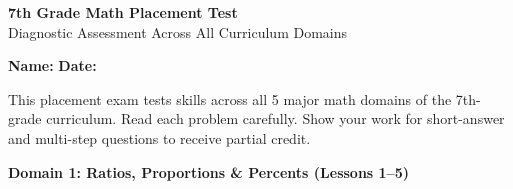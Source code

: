 \documentclass[12pt, letterpaper, fleqn]{article}
\begin{document}
\begin{center}
    {\LARGE \textbf{7th Grade Math Placement Test}}\\[4pt]
    {\large Diagnostic Assessment Across All Curriculum Domains}
\end{center}

\vspace{4mm}
\textbf{Name:} \underline{\hspace{6cm}}
\hfill
\textbf{Date:} \underline{\hspace{4cm}}\\
\vspace{2mm}

\begin{tcolorbox}[colback=black!5, colframe=black!40, arc=2mm, title=\textbf{Instructions for Students}]
This placement exam tests skills across all 5 major math domains of the 7th-grade curriculum. Read each problem carefully. Show your work for short-answer and multi-step questions to receive partial credit.
\end{tcolorbox}

\vspace{4mm}

\begin{tcolorbox}[colback=white, colframe=black, arc=2mm]
    \textbf{Domain 1: Ratios, Proportions \& Percents (Lessons 1--5)}
\end{tcolorbox}
\end{document}
